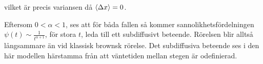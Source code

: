 vilket är precis variansen då $\ev{\Delta x}=0$.

Eftersom $0<\alpha<1$, ses att för båda fallen så kommer sannolikhetsfördelningen $\psi(t)\sim \frac{1}{t^{\alpha+1}}$, för stora $t$, leda till ett subdiffusivt beteende. Rörelsen blir alltså långsammare än vid klassisk brownsk rörelse. Det subdiffusiva beteende ses i den här modellen härstamma från att väntetiden mellan stegen är odefinierad. 




